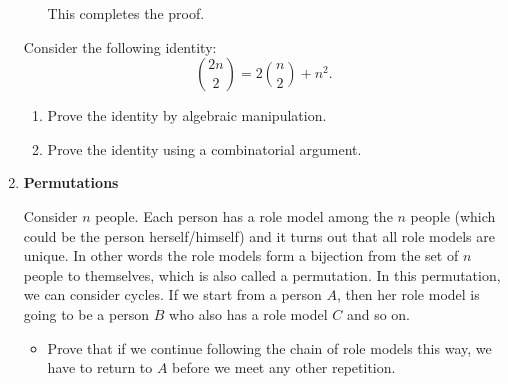 \documentclass[11pt]{article}
\newif\ifsolutions
\begin{document}
\begin{enumerate}
\begin{enumerate}
{{        This completes the proof.
      }} \fi
  \end{enumerate}


  Consider the following identity: $$ \binom{2n}{2} = 2 \binom{n}{2} + n^2. $$
  \begin{enumerate}
  \item Prove the identity by algebraic manipulation.
	\vspace{30mm}

    \ifsolutions{\color{blue}
	\vspace{-30mm}
      {\begin{eqnarray*}
          \binom{2n}{2} &=& \frac{2n(2n-1)} {2} \\
          &=& n(2n-1) \\
          &=& n(n-1) + n^2 \\
          &=& 2\frac{n(n-1)}{2} + n^2 \\
          &=& 2\binom{n}{2} + n^2.
          \end{eqnarray*}
    }} \fi
    
  \item Prove the identity using a combinatorial argument.  
    
    \ifsolutions{\color{blue}
      {The left hand side is the number of ways to choose two elements    
        out of $2n$. Counting in another way, we first divide the $2n$
        elements (arbitrarily) into two sets of $n$ elements.  Then we consider
        three cases: either we choose both
        elements out of the first $n$-element set, both out of the second 
        $n$-element set, or one element out of each set. The number of ways we
        can do each of these things is $\binom{n}{2}$, $\binom{n}{2}$, and $n^2$,
        respectively. Since these three cases are mutually exclusive and cover
        all the  possibilities, summing them must give the same number 
        as the left hand side.  This completes the proof.
      }} \fi
  \end{enumerate}

  
\newpage
\item {\bf Permutations }
  
  Consider $n$ people. Each person has a role model among the $n$ people (which could be the person herself/himself) and it turns out that
  all role models are unique. In other words the role models form a bijection from the set of $n$ people to themselves, which
  is also called a permutation. In this permutation, we can consider cycles. If we start from a person $A$, then her role model
  is going to be a person $B$ who also has a role model $C$ and so on.
  \begin{itemize}
    \item Prove that if we continue following the chain of role models this way, we have to return to $A$ before we meet any other repetition.
	\vspace{20mm}


\end{itemize}
\end{enumerate}
\end{document}
